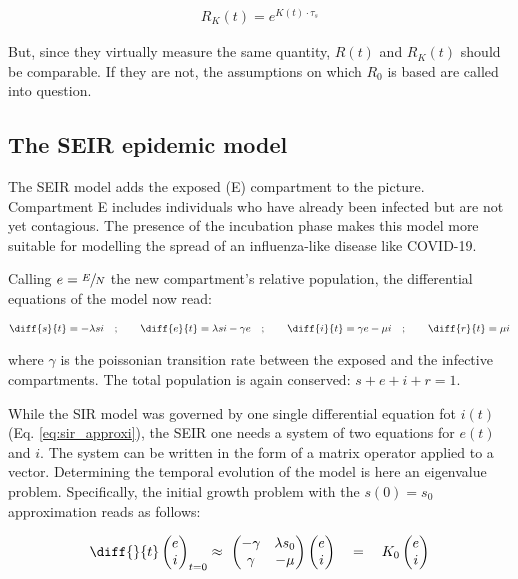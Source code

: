 \documentclass[DIV=12, BCOR=0pt]{scrartcl}  %
\begin{document}
  \begin{align}
  	R_K(t) = e^{K(t) \cdot \tau_s}
  	\label{eq:RKt}
  \end{align}

	But, since they virtually measure the same quantity, $R(t)$ and $R_K(t)$ should be comparable. If they are not, the assumptions on which $R_0$ is based are called into question.
  
  \subsection{The SEIR epidemic model}
  The SEIR model adds the exposed (E) compartment to the picture. Compartment E includes individuals who have already been infected but are not yet contagious. The presence of the incubation phase makes this model more suitable for modelling the spread of an influenza-like disease like COVID-19. 
  
  Calling $e = \sfrac{E}{N}$ the new compartment's relative population, the differential equations of the model now read:
  
  \begin{align}
  	\diff{s}{t} = - \lambda s i \quad;  \qquad 	\diff{e}{t} = \lambda s i - \gamma e \quad; \qquad \diff{i}{t} = \gamma e - \mu i \quad; \qquad \diff{r}{t} = \mu i
  	\label{eq:seir}
  \end{align}

  where $\gamma$ is the poissonian transition rate between the exposed and the infective compartments. The total population is again conserved: $ s + e + i + r = 1$.
  
  While the SIR model was governed by one single differential equation fot $i(t)$ (Eq. \ref{eq:sir_approxi}), the SEIR one needs a system of two equations for $e(t)$ and $i$.
  The system can be written in the form of a matrix operator applied to a vector. Determining the temporal evolution of the model is here an eigenvalue problem. Specifically, the initial growth problem with the $s(0) = s_0$ approximation reads as follows: 
  
  \begin{align}
  	\diff{}{t}
  	\begin{pmatrix}
  			e \\
  			i
  	\end{pmatrix}_{t=0}
  	\approx \
  	\begin{pmatrix}
  		 - \gamma & \lambda s_0\\
  		 \gamma & - \mu
  	\end{pmatrix}
  	\begin{pmatrix}
  		e \\
  		i
  	\end{pmatrix}
	  \quad = \quad K_0 %
	  \begin{pmatrix}
	  	e \\
	  	i
	  \end{pmatrix} %
		\label{eq:seir_approxi}
	\end{align}
\end{document}
